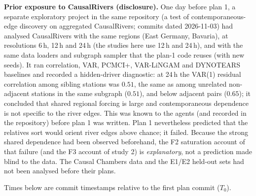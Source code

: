 \textbf{Prior exposure to CausalRivers (disclosure).} One day before plan 1, a
separate exploratory project in the same repository (a test of
contemporaneous-edge discovery on aggregated CausalRivers; commits dated
2026-11-03) had analysed CausalRivers with the same regions (East Germany,
Bavaria), at resolutions 6\,h, 12\,h and 24\,h (the studies here use 12\,h and
24\,h), and with the same data loaders and subgraph sampler that the plan-1 code
reuses (with new seeds). It ran correlation, VAR, PCMCI+, VAR-LiNGAM and
DYNOTEARS baselines and recorded a hidden-driver diagnostic: at 24\,h the VAR(1)
residual correlation among sibling stations was $0.51$, the same as among
unrelated non-adjacent stations in the same subgraph ($0.51$), and below
adjacent pairs ($0.65$); it concluded that shared regional forcing is large and
contemporaneous dependence is not specific to the river edges. This was known
to the agents (and recorded in the repository) before plan 1 was written. Plan
1 nevertheless predicted that the relatives sort would orient river edges
above chance; it failed. Because the strong shared dependence had been
observed beforehand, the F2 saturation account of that failure (and the F3
account of study 2) is \emph{explanatory}, not a prediction made blind to the
data. The Causal Chambers data and the E1/E2 held-out sets had not been
analysed before their plans.

Times below are commit timestamps relative to the first plan commit ($T_0$).

